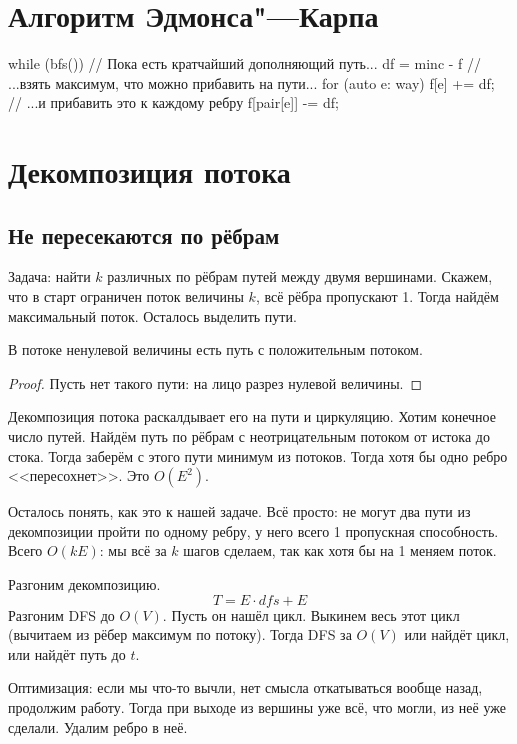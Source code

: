 \section{Алгоритм Эдмонса"---Карпа}

\begin{cppcode}
while (bfs()) {           // Пока есть кратчайший дополняющий путь...
	df = min{c - f}       // ...взять максимум, что можно прибавить на пути...
	for (auto e: way) {
		f[e] += df;       // ...и прибавить это к каждому ребру
		f[pair[e]] -= df;
	}
}
\end{cppcode}

\section{Декомпозиция потока}

\subsection{Не пересекаются по рёбрам}

Задача: найти $k$ различных по рёбрам путей между двумя вершинами.
Скажем, что в старт ограничен поток величины $k$, всё рёбра пропускают 1.
Тогда найдём максимальный поток.
Осталось выделить пути.

\begin{lemma}
	В потоке ненулевой величины есть путь с положительным потоком.
\end{lemma}
\begin{proof}
	Пусть нет такого пути: на лицо разрез нулевой величины.
\end{proof}

Декомпозиция потока раскалдывает его на пути и циркуляцию.
Хотим конечное число путей.
Найдём путь по рёбрам с неотрицательным потоком от истока до стока.
Тогда заберём с этого пути минимум из потоков.
Тогда хотя бы одно ребро <<пересохнет>>.
Это $O(E^2)$.

Осталось понять, как это к нашей задаче.
Всё просто: не могут два пути из декомпозиции пройти по одному ребру, у него всего 1 пропускная способность.
Всего $O(kE)$: мы всё за $k$ шагов сделаем, так как хотя бы на 1 меняем поток.

Разгоним декомпозицию.
\[ T = E \cdot dfs + E \]
Разгоним DFS до $O(V)$.
Пусть он нашёл цикл.
Выкинем весь этот цикл (вычитаем из рёбер максимум по потоку).
Тогда DFS за $O(V)$ или найдёт цикл, или найдёт путь до $t$.

Оптимизация: если мы что-то вычли, нет смысла откатываться вообще назад, продолжим работу.
Тогда при выходе из вершины уже всё, что могли, из неё уже сделали.
Удалим ребро в неё.

